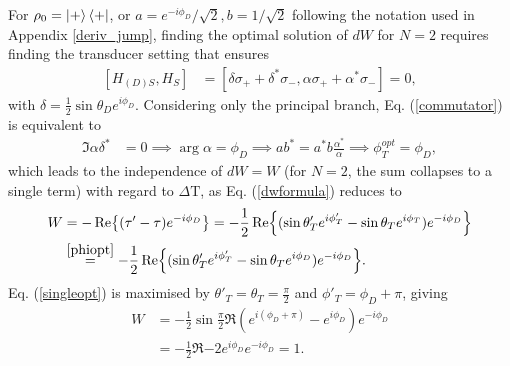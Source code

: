 For $\rho_0 = \ket{+} \bra{+}$, or $a = e^{-i \phi_D}/\sqrt{2}, b = 1/\sqrt{2}$ following the notation used in Appendix \ref{deriv_jump}, finding the optimal solution of $dW$ for $N = 2$ requires finding the transducer setting that ensures
\begin{align}\label{commutator}
	[H_{(D)S}, H_S] &= [\delta \sigma_{+} + \delta^* \sigma_{-}, \alpha \sigma_{+} + \alpha^* \sigma_{-}] = 0,
\end{align}
with $\delta = \frac{1}{2} \sin{\theta_D} e^{i \phi_D}$.
Considering only the principal branch, Eq. (\ref{commutator}) is equivalent to
\begin{align}
	\Im{\alpha \delta^*} &= 0 \implies \arg{\alpha} = \phi_D \implies a b^* = a^* b \frac{\alpha^*}{\alpha} \implies \phi_T^{opt} = \phi_D, \label{phiopt}
\end{align}
which leads to the independence of $dW = W$ (for $N=2$, the sum collapses to a single term) with regard to $\Delta \mathrm{T}$, as Eq. (\ref{dwformula}) reduces to
\begin{align}
	W &= - \Re{(\tau' - \tau) e^{-i\phi_D}} = - \frac{1}{2} \Re{(\sin \theta'_T e^{i\phi'_T} - \sin \theta_T e^{i\phi_T}) e^{-i\phi_D}} \\
	&\overset{\ref{phiopt}}{=} - \frac{1}{2} \Re{(\sin \theta'_T e^{i\phi'_T} - \sin \theta_T e^{i\phi_D}) e^{-i\phi_D}}. \label{singleopt}
\end{align}
Eq. (\ref{singleopt}) is maximised by $\theta'_T = \theta_T = \frac{\pi}{2}$ and $\phi'_T = \phi_D + \pi$, giving
\begin{align}
	W &= - \frac{1}{2} \sin \frac{\pi}{2} \Re{(e^{i(\phi_D + \pi)} - e^{i\phi_D}) e^{-i\phi_D}} \nonumber \\
	&= - \frac{1}{2} \Re{ -2 e^{i\phi_D} e^{-i\phi_D}} = 1.
\end{align}

